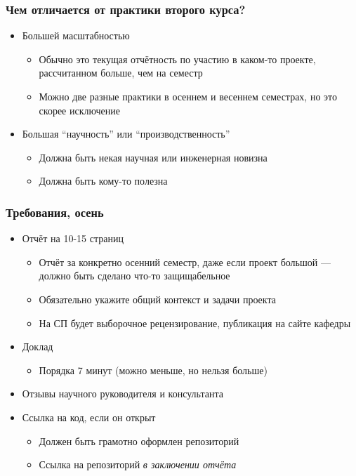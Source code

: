 \documentclass{../../slides-style}
\begin{document}
    
    \begin{frame}[plain]
        \titlepage
    \end{frame}

    \begin{frame}
        \frametitle{Чем отличается от практики второго курса?}
        \begin{itemize}
            \item Большей масштабностью
            \begin{itemize}
                \item Обычно это текущая отчётность по участию в каком-то проекте, рассчитанном больше, чем на семестр
                \item Можно две разные практики в осеннем и весеннем семестрах, но это скорее исключение
            \end{itemize}
            \item Большая \enquote{научность} или \enquote{производственность}
            \begin{itemize}
                \item Должна быть некая научная или инженерная новизна
                \item Должна быть кому-то полезна
            \end{itemize}
        \end{itemize}
    \end{frame}

    \begin{frame}
        \frametitle{Требования, осень}
        \begin{itemize}
            \item Отчёт на 10-15 страниц
            \begin{itemize}
                \item Отчёт за конкретно осенний семестр, даже если проект большой --- должно быть сделано что-то защищабельное
                \item Обязательно укажите общий контекст и задачи проекта
                \item На СП будет выборочное рецензирование, публикация на сайте кафедры
            \end{itemize}
            \item Доклад
            \begin{itemize}
                \item Порядка 7 минут (можно меньше, но нельзя больше)
            \end{itemize}
            \item Отзывы научного руководителя и консультанта
            \item Ссылка на код, если он открыт
            \begin{itemize}
                \item Должен быть грамотно оформлен репозиторий
                \item Ссылка на репозиторий \emph{в заключении отчёта}
            \end{itemize}
        \end{itemize}
    \end{frame}
\end{document}
